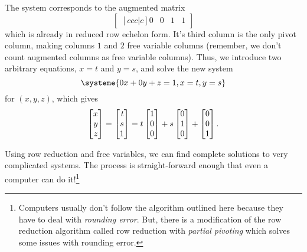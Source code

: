 	The system corresponds to the augmented matrix
	\[
		\begin{bmatrix}[ccc|c]
			0&0&1&1
		\end{bmatrix}
	\]
	which is already in reduced row echelon form. It's third column is the only pivot column, making columns $1$ and $2$
	free variable columns (remember, we don't count augmented columns as free variable columns). 
	Thus, we introduce two arbitrary equations, $x=t$ and $y=s$, and solve the new system
	\[
		\systeme{0x+0y+z=1,x=t,y=s}
	\]
	for $(x,y,z)$, which gives
	\[
		\mat{x\\y\\z}= \mat{t\\s\\1} = t\mat{1\\0\\0}+s\mat{0\\1\\0}+\mat{0\\0\\1}.
	\]

	\medskip
	Using row reduction and free variables, we can find complete solutions to very complicated systems.
	The process is straight-forward enough that even a computer can do it!\footnote{
		Computers usually don't follow the algorithm outlined here because they have
		to deal with \emph{rounding error}. But, there is a modification of the row
		reduction algorithm called row reduction with \emph{partial pivoting} which
		solves some issues with rounding error.
	}

